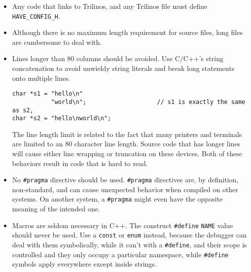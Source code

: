 \documentclass[10pt,letter,relax]{SANDreport}
\begin{document}
\begin{itemize}
\item Any code that links to Trilinos, and any Trilinos file must define
  \verb!HAVE_CONFIG_H!.
\item Although there is no maximum length requirement for source files,
  long files are cumbersome to deal
  with. 
\item Lines longer than 80 columns should be avoided. Use C/C++'s string
  concatenation to avoid unwieldy string literals and break long
  statements onto multiple lines. 
\begin{verbatim}
char *s1 = "hello\n"
           "world\n";                    // s1 is exactly the same as s2,
char *s2 = "hello\nworld\n";
\end{verbatim}
The line length limit is related to the fact that many printers and
terminals are limited to an 80 character line length. Source code that
has longer lines will cause either line wrapping or truncation on these
devices. Both of these behaviors result in code that is hard to read.
\item No \verb!#pragma! directive should be used. \verb!#pragma!
  directives are, by definition, non-standard, and can cause unexpected
  behavior when compiled on other systems. On another system, a \verb!#pragma!
  might even have the opposite meaning of the intended one.
\item Macros are seldom necessary in C++.  The construct \verb!#define!
  \verb!NAME! value should never be used. Use a {\tt const} or {\tt enum}
  instead, because the debugger can deal with them symbolically, 
  while it can't with a
  \verb!#define!, and their scope is controlled and they only occupy a
  particular namespace, while \verb!#define! symbols apply everywhere except
  inside strings.
  

\end{itemize}
\end{document}
